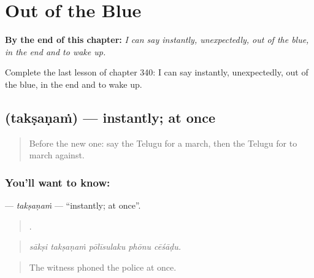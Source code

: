 
\chapter{Out of the Blue}
\label{ch:te-out-of-the-blue}

\begin{chapteropening}
\textbf{By the end of this chapter:} \emph{I can say instantly, unexpectedly, out of the blue, in the end and to wake up.}

Complete the last lesson of chapter 340: I can say instantly, unexpectedly, out of the blue, in the end and to wake up.
\end{chapteropening}

\section[\texorpdfstring{\te{తక్షణం} (takṣaṇaṁ)}{తక్షణం (takṣaṇaṁ)}]{ (takṣaṇaṁ) — instantly; at once}

\label{lesson:TE-C340-taksanam}



\begin{quote}
Before the new one: say the Telugu for a march, then the Telugu for to march against.
\end{quote}

\subsection*{You'll want to know: }
\textbf{} — \emph{takṣaṇaṁ} — \textquotedblleft{}instantly; at once\textquotedblright{}.

\begin{quote}
    .
\end{quote}

\begin{quote}
\emph{sākṣi takṣaṇaṁ pōlīsulaku phōnu cēśāḍu.}
\end{quote}

\begin{quote}
The witness phoned the police at once.
\end{quote}

